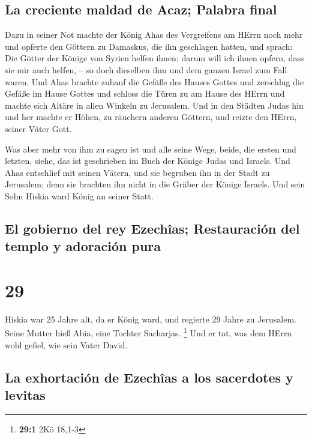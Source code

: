 \hypertarget{la-creciente-maldad-de-acaz-palabra-final}{%
\subsection{La creciente maldad de Acaz; Palabra
final}\label{la-creciente-maldad-de-acaz-palabra-final}}

 Dazu in seiner Not machte der König Ahas des Vergreifens
am HErrn noch mehr  und opferte den Göttern zu Damaskus,
die ihn geschlagen hatten, und sprach: Die Götter der Könige von Syrien
helfen ihnen; darum will ich ihnen opfern, dass sie mir auch helfen, --
so doch dieselben ihm und dem ganzen Israel zum Fall waren.
 Und Ahas brachte zuhauf die Gefäße des Hauses Gottes und
zerschlug die Gefäße im Hause Gottes und schloss die Türen zu am Hause
des HErrn und machte sich Altäre in allen Winkeln zu Jerusalem.
 Und in den Städten Judas hin und her machte er Höhen, zu
räuchern anderen Göttern, und reizte den HErrn, seiner Väter Gott.

 Was aber mehr von ihm zu sagen ist und alle seine Wege,
beide, die ersten und letzten, siehe, das ist geschrieben im Buch der
Könige Judas und Israels.  Und Ahas entschlief mit seinen
Vätern, und sie begruben ihn in der Stadt zu Jerusalem; denn sie
brachten ihn nicht in die Gräber der Könige Israels. Und sein Sohn
Hiskia ward König an seiner Statt.

\hypertarget{el-gobierno-del-rey-ezechuxeeas-restauraciuxf3n-del-templo-y-adoraciuxf3n-pura}{%
\subsection{El gobierno del rey Ezechîas; Restauración del templo y
adoración
pura}\label{el-gobierno-del-rey-ezechuxeeas-restauraciuxf3n-del-templo-y-adoraciuxf3n-pura}}

\hypertarget{section-28}{%
\section{29}\label{section-28}}

 Hiskia war 25 Jahre alt, da er König ward, und regierte
29 Jahre zu Jerusalem. Seine Mutter hieß Abia, eine Tochter Sacharjas.
\footnote{\textbf{29:1} 2Kö 18,1-3}  Und er tat, was dem
HErrn wohl gefiel, wie sein Vater David.

\hypertarget{la-exhortaciuxf3n-de-ezechuxeeas-a-los-sacerdotes-y-levitas}{%
\subsection{La exhortación de Ezechîas a los sacerdotes y
levitas}\label{la-exhortaciuxf3n-de-ezechuxeeas-a-los-sacerdotes-y-levitas}}

